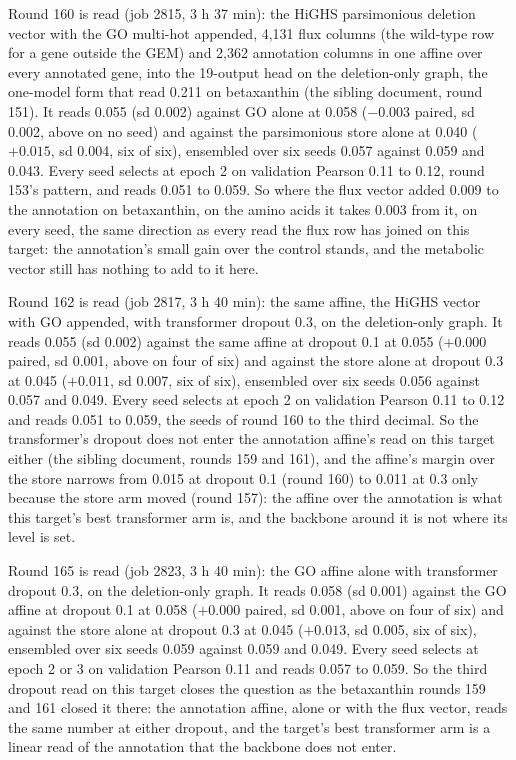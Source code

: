 Round 160 is read (job 2815, 3 h 37 min): the HiGHS parsimonious deletion vector with
the GO multi-hot appended, 4,131 flux columns (the wild-type row for a gene outside the
GEM) and 2,362 annotation columns in one affine over every annotated gene, into the
19-output head on the deletion-only graph, the one-model form that read 0.211 on
betaxanthin (the sibling document, round 151). It reads 0.055 (sd 0.002) against GO
alone at 0.058 ($-0.003$ paired, sd 0.002, above on no seed) and against the
parsimonious store alone at 0.040 ($+0.015$, sd 0.004, six of six), ensembled over six
seeds 0.057 against 0.059 and 0.043. Every seed selects at epoch 2 on validation
Pearson 0.11 to 0.12, round 153's pattern, and reads 0.051 to 0.059. So where the flux
vector added 0.009 to the annotation on betaxanthin, on the amino acids it takes 0.003
from it, on every seed, the same direction as every read the flux row has joined on
this target: the annotation's small gain over the control stands, and the metabolic
vector still has nothing to add to it here.

Round 162 is read (job 2817, 3 h 40 min): the same affine, the HiGHS vector with GO
appended, with transformer dropout 0.3, on the deletion-only graph. It reads 0.055 (sd
0.002) against the same affine at dropout 0.1 at 0.055 ($+0.000$ paired, sd 0.001,
above on four of six) and against the store alone at dropout 0.3 at 0.045 ($+0.011$,
sd 0.007, six of six), ensembled over six seeds 0.056 against 0.057 and 0.049. Every
seed selects at epoch 2 on validation Pearson 0.11 to 0.12 and reads 0.051 to 0.059, the
seeds of round 160 to the third decimal. So the transformer's dropout does not enter the
annotation affine's read on this target either (the sibling document, rounds 159 and
161), and the affine's margin over the store narrows from 0.015 at dropout 0.1 (round
160) to 0.011 at 0.3 only because the store arm moved (round 157): the affine over the
annotation is what this target's best transformer arm is, and the backbone around it
is not where its level is set.

Round 165 is read (job 2823, 3 h 40 min): the GO affine alone with transformer dropout
0.3, on the deletion-only graph. It reads 0.058 (sd 0.001) against the GO affine at
dropout 0.1 at 0.058 ($+0.000$ paired, sd 0.001, above on four of six) and against the
store alone at dropout 0.3 at 0.045 ($+0.013$, sd 0.005, six of six), ensembled over
six seeds 0.059 against 0.059 and 0.049. Every seed selects at epoch 2 or 3 on
validation Pearson 0.11 and reads 0.057 to 0.059. So the third dropout read on this
target closes the question as the betaxanthin rounds 159 and 161 closed it there: the
annotation affine, alone or with the flux vector, reads the same number at either
dropout, and the target's best transformer arm is a linear read of the annotation
that the backbone does not enter.


